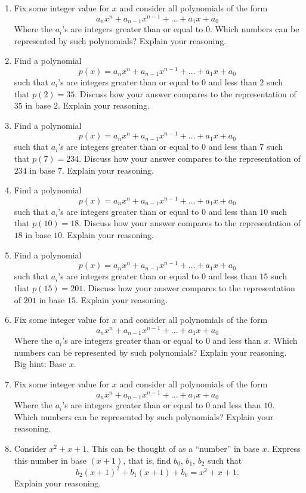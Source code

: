 \begin{problems}
\begin{enumerate}
\item Fix some integer value for $x$ and consider all polynomials of
  the form
\[
a_nx^n + a_{n-1}x^{n-1} + \dots + a_1 x+ a_0
\]
Where the $a_i$'s are integers greater than or equal to $0$. Which
numbers can be represented by such polynomials? Explain your
reasoning.
\item Find a polynomial 
\[
p(x) = a_nx^n + a_{n-1}x^{n-1} + \dots + a_1 x+ a_0
\]
such that $a_i$'s are integers greater than or equal to $0$ and less
than $2$ such that $p(2) = 35$. Discuss how your answer compares to
the representation of $35$ in base $2$. Explain your reasoning.
\item Find a polynomial 
\[
p(x) = a_nx^n + a_{n-1}x^{n-1} + \dots + a_1 x+ a_0
\]
such that $a_i$'s are integers greater than or equal to $0$ and less
than $7$ such that $p(7) = 234$. Discuss how your answer compares to
the representation of $234$ in base $7$. Explain your reasoning. 
\item Find a polynomial 
\[
p(x) = a_nx^n + a_{n-1}x^{n-1} + \dots + a_1 x+ a_0
\]
such that $a_i$'s are integers greater than or equal to $0$ and less
than $10$ such that $p(10) = 18$. Discuss how your answer compares to
the representation of $18$ in base $10$. Explain your reasoning.
\item Find a polynomial 
\[
p(x) = a_nx^n + a_{n-1}x^{n-1} + \dots + a_1 x+ a_0
\]
such that $a_i$'s are integers greater than or equal to $0$ and less
than $15$ such that $p(15) = 201$. Discuss how your answer compares to
the representation of $201$ in base $15$. Explain your reasoning.
\item Fix some integer value for $x$ and consider all polynomials of the form
\[
a_nx^n + a_{n-1}x^{n-1} + \dots + a_1 x+ a_0
\]
Where the $a_i$'s are integers greater than or equal to $0$ and less
than $x$. Which numbers can be represented by such polynomials?
Explain your reasoning. Big hint: Base $x$.
\item Fix some integer value for $x$ and consider all polynomials of
  the form
\[
a_nx^n + a_{n-1}x^{n-1} + \dots + a_1 x+ a_0
\]
Where the $a_i$'s are integers greater than or equal to $0$ and less
than $10$. Which numbers can be represented by such polynomials?
Explain your reasoning.

\item Consider $x^2 + x + 1$. This can be thought of as a ``number'' in
  base $x$. Express this number in base $(x+1)$, that is, find $b_0$, $b_1$, $b_2$ such that 
\[
b_2(x+1)^2 +b_1(x+1) + b_0 = x^2 + x + 1.
\]
Explain your reasoning.


\end{enumerate}
\end{problems}

